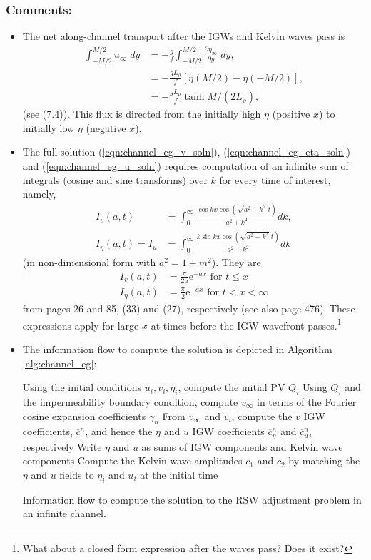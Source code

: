 \documentclass[10pt,reqno]{amsart}
\newcommand{\expe}{{\mathrm e}}
\begin{document}
\subsubsection*{Comments:}
\begin{itemize}
\item The net along-channel transport after the IGWs and Kelvin waves pass is
\begin{align}
\int _{-M/2} ^{M/2} u_\infty \; d y & =  - \frac{g}{f} \int _{-M/2} ^{M/2} \frac{\partial \eta_\infty}{\partial y} \; dy, \nonumber \\
 & =  - \frac{g L_\rho}{f} \left[ \eta (M/2) - \eta (-M/2) \right] , \nonumber \\
 & =  - \frac{g L_\rho}{f} \tanh M / (2 L_\rho) ,
\end{align}
(see \citealt{gill76} (7.4)).
This flux is directed from the initially high $\eta$ (positive $x$) to initially low $\eta$ (negative $x$).
\item The full solution (\ref{eqn:channel_eg_v_soln}), (\ref{eqn:channel_eg_eta_soln}) and (\ref{eqn:channel_eg_u_soln}) requires computation of an infinite sum of integrals (cosine and sine transforms) over $k$ for every time of interest, namely,
\begin{align}
I_v (a, t) & = \int_{0} ^{\infty} \frac{ \cos k x \cos \left( \sqrt{a^2 + k^2 } \; t\right)}{ a^2 + k^2}  dk   , \\
I_\eta (a, t)= I_u & = \int_{0}^{\infty} \frac{ k \sin  k x  \cos \left( \sqrt{a^2 + k^2 } \; t\right)}{ a^2 +  k^2  }  dk 
\end{align}
(in non-dimensional form with $a^2 = 1 + m^2$).
They are
\begin{align}
I_v (a, t) & = \frac{\pi}{2 a} \expe^{- a x} \text{~for~} t \le x  \\
I_\eta (a, t) & = \frac{\pi}{2} \expe^{- a x} \text{~for~} t < x < \infty
\end{align}
from \citet{erdelyi_etal54} pages 26 and 85, (33) and (27), respectively (see also \citealt{gradshteyn&ryzhik00} page 476).
These expressions apply for large $x$ at times before the IGW wavefront passes.\footnote{What about a closed form expression after the waves pass?  Does it exist?}
\item The information flow to compute the solution is depicted in Algorithm \ref{alg:channel_eg}:

\begin{algorithm}[t]
Using the initial conditions $u_i, v_i, \eta_i$, compute the initial PV $Q_i$ \;
Using $Q_i$ and the impermeability boundary condition, compute $v_\infty$ in terms of the Fourier cosine expansion coefficients $\gamma_n$ \;
From $v_\infty$ and $v_i$, compute the $v$ IGW coefficients, $\overline{c}^n$, and hence the $\eta$ and $u$ IGW coefficients $\overline{c}^n_\eta$ and $\overline{c}^n_u$, respectively \;
Write $\eta$ and $u$ as sums of IGW components and Kelvin wave components \;
Compute the Kelvin wave amplitudes $\overline{c}_1$ and $\overline{c}_2$ by matching the $\eta$ and $u$ fields to $\eta_i$ and $u_i$ at the initial time
 \caption{Information flow to compute the solution to the RSW adjustment problem in an infinite channel.
 \label{alg:channel_eg}}
\end{algorithm}


\end{itemize}
\end{document}
